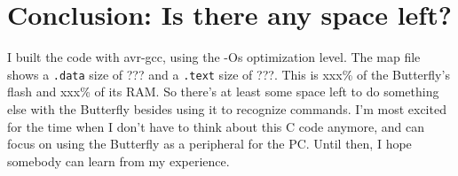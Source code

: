 \clearpage{}
\section{Conclusion: Is there any space left?}
I built the code with avr-gcc, using the -Os optimization level.  The map file shows a \texttt{.data} size of ??? and a \texttt{.text} size of ???.  This is xxx\% of the Butterfly's flash and xxx\% of its RAM.  So there's at least some space left to do something else with the Butterfly besides using it to recognize commands.  I'm most excited for the time when I don't have to think about this C code anymore, and can focus on using the Butterfly as a peripheral for the PC.  Until then, I hope somebody can learn from my experience.





\clearpage{}
\raggedright


